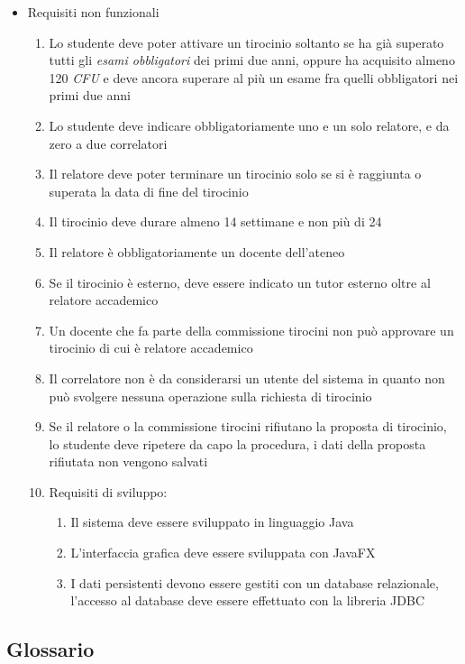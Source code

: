\documentclass[12pt]{article}
\begin{document}
\begin{itemize}
   \item Requisiti non funzionali
   \begin{enumerate}
      \item Lo studente deve poter attivare un tirocinio soltanto se ha già superato tutti gli \emph{esami obbligatori} dei primi due anni, oppure ha acquisito almeno 120 \emph{CFU} e deve ancora superare al più un esame fra quelli obbligatori nei primi due anni
      \item Lo studente deve indicare obbligatoriamente uno e un solo relatore, e da zero a due correlatori
      \item Il relatore deve poter terminare un tirocinio solo se si è raggiunta o superata la data di fine del tirocinio
      \item Il tirocinio deve durare almeno 14 settimane e non più di 24
      \item Il relatore è obbligatoriamente un docente dell'ateneo
      \item Se il tirocinio è esterno, deve essere indicato un tutor esterno oltre al relatore accademico
      \item Un docente che fa parte della commissione tirocini non può approvare un tirocinio di cui è relatore accademico
      \item Il correlatore non è da considerarsi un utente del sistema in quanto non può svolgere nessuna operazione sulla richiesta di tirocinio
      \item Se il relatore o la commissione tirocini rifiutano la proposta di tirocinio, lo studente deve ripetere da capo la procedura, i dati della proposta rifiutata non vengono salvati
      \item Requisiti di sviluppo:
      \begin{enumerate}
         \item Il sistema deve essere sviluppato in linguaggio Java
         \item L'interfaccia grafica deve essere sviluppata con JavaFX
         \item I dati persistenti devono essere gestiti con un database relazionale, l'accesso al database deve essere effettuato con la libreria JDBC
      \end{enumerate}
   \end{enumerate}
\end{itemize}

\subsection{Glossario}
\end{document}
